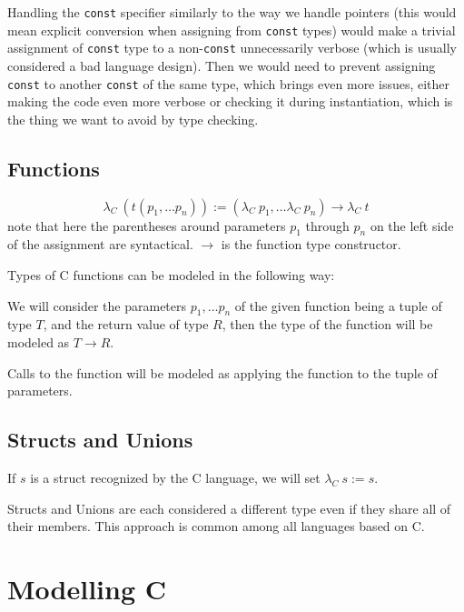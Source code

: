 Handling the \lstinline{const} specifier similarly to the way we handle pointers (this would mean explicit conversion when assigning from \lstinline{const} types) would make a trivial assignment of \lstinline{const} type to a non-\lstinline{const} unnecessarily verbose (which is usually considered a bad language design). Then we would need to prevent assigning \lstinline{const} to another \lstinline{const} of the same type, which brings even more issues, either making the code even more verbose or checking it during instantiation, which is the thing we want to avoid by type checking.

\subsection{Functions}

\begin{defn}
    $$\lambda_C\ (t(p_1, \dots p_n)) := (\lambda_C\ p_1, \dots \lambda_C\ p_n) \rightarrow \lambda_C\ t$$
    note that here the parentheses around parameters $p_1$ through $p_n$ on the left side of the assignment are syntactical. $\rightarrow$ is the function type constructor.
\end{defn}

Types of C functions can be modeled in the following way:

We will consider the parameters $p_1, \dots p_n$ of the given function being a tuple of type $T$, and the return value of type $R$, then the type of the function will be modeled as $T \rightarrow R$.

Calls to the function will be modeled as applying the function to the tuple of parameters.

\subsection{Structs and Unions}

\begin{defn}
    If $s$ is a struct recognized by the C language, we will set $\lambda_C\ s := s$.
\end{defn}

Structs and Unions are each considered a different type even if they share all of their members. This approach is common among all languages based on C.

\section{Modelling C}

